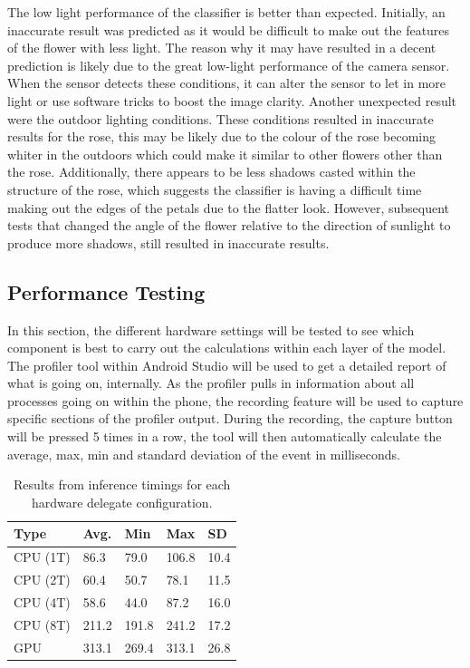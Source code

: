 \documentclass[12pt,a4paper]{report}
\begin{document}
The low light performance of the classifier is better than expected. Initially, an inaccurate result was predicted as it
would be difficult to make out the features of the flower with less light. The reason why it may have resulted in a 
decent prediction is likely due to the great low-light performance of the camera sensor. When the sensor detects these 
conditions, it can alter the sensor to let in more light or use software tricks to boost the image clarity. Another 
unexpected result were the outdoor lighting conditions. These conditions resulted in inaccurate results for the rose, 
this may be likely due to the colour of the rose becoming whiter in the outdoors which could make it similar to other 
flowers other than the rose. Additionally, there appears to be less shadows casted within the structure of the rose, 
which suggests the classifier is having a difficult time making out the edges of the petals due to the flatter look. 
However, subsequent tests that changed the angle of the flower relative to the direction of sunlight to produce more 
shadows, still resulted in inaccurate results. 

\subsection{Performance Testing}

In this section, the different hardware settings will be tested to see which component is best to carry out the 
calculations within each layer of the model. The profiler tool within Android Studio will be used to get a detailed 
report of what is going on, internally. As the profiler pulls in information about all processes going on within the 
phone, the recording feature will be used to capture specific sections of the profiler output. During the recording, 
the capture button will be pressed 5 times in a row, the tool will then automatically calculate the average, max, min 
and standard deviation of the event in milliseconds.

\begin{table}[h!]
    \centering
    \begin{tabular}{ |l|l|l|l|l| }
        \hline
        Type & Avg. & Min & Max & SD \\
        \hline
        \hline
        CPU (1T) & 86.3 & 79.0 & 106.8 & 10.4 \\
        \hline
        CPU (2T) & 60.4 & 50.7 & 78.1 & 11.5 \\
        \hline
        CPU (4T) & 58.6 & 44.0 & 87.2 & 16.0 \\
        \hline
        CPU (8T) & 211.2 & 191.8 & 241.2 & 17.2 \\
        \hline
        GPU & 313.1 & 269.4 & 313.1 & 26.8 \\
        \hline

        
    \end{tabular}
    \caption{Results from inference timings for each hardware delegate configuration.}
    \label{table:timings}
\end{table}
\end{document}
